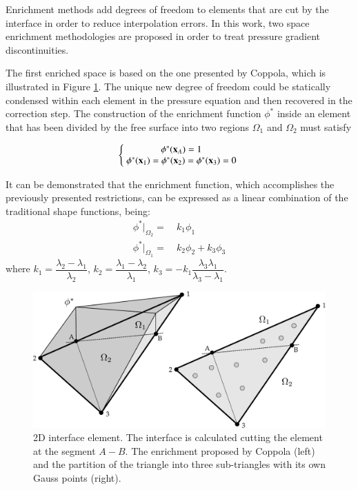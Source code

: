 Enrichment methods add degrees of freedom to elements that are cut by the interface in order to reduce interpolation errors. In this work, two space enrichment methodologies are proposed in order to treat pressure gradient discontinuities.

The first enriched space is based on the one presented by Coppola\cite{Coppola05}, which is illustrated in Figure \ref{fg:enrichment1}. The unique new degree of freedom could be statically condensed within each element in the pressure equation and then recovered in the correction step. The construction of the enrichment function $\phi^*$ inside an element that has been divided by the free surface into two regions $\Omega_1$ and $\Omega_2$ must satisfy

\begin{equation}
   \left\{\;
   \begin{matrix}
      \phi^*(\mathbf{x}_A)= 1 \\
      \phi^*(\mathbf{x}_1)= \phi^*(\mathbf{x}_2)=\phi^*(\mathbf{x}_3)= 0
   \end{matrix}\;
   \right.
   \label{eq:enrich-1a}
\end{equation}

It can be demonstrated\cite{Coppola05} that the enrichment function, which accomplishes the previously presented restrictions, can be expressed as a linear combination of the traditional shape functions, being:
 \begin{align}
    \phi^*|_{\Omega_2} = & \ k_1 \phi_1 \label{phi_enrichment-2}\\
    \phi^*|_{\Omega_1} = & \ k_2 \phi_2 + k_3 \phi_3 \label{phi_enrichment-1}
  \end{align}
where $k_1 = \dfrac{\lambda_2-\lambda_1}{\lambda_2}$, $k_2 = \dfrac{\lambda_1-\lambda_2}{\lambda_1}$, $k_3 = -k_1\dfrac{\lambda_3\lambda_1}{\lambda_3-\lambda_1}$.

\begin{figure}[H]
  \centering
  \includegraphics[width=.9\columnwidth]{images/enrichment1.pdf}
   \caption{2D interface element. The interface is calculated cutting the element at the segment $A-B$. The enrichment proposed by Coppola (left) and the partition of the triangle into three sub-triangles with its own Gauss points (right).}
   \label{fg:enrichment1}                %
\end{figure}

